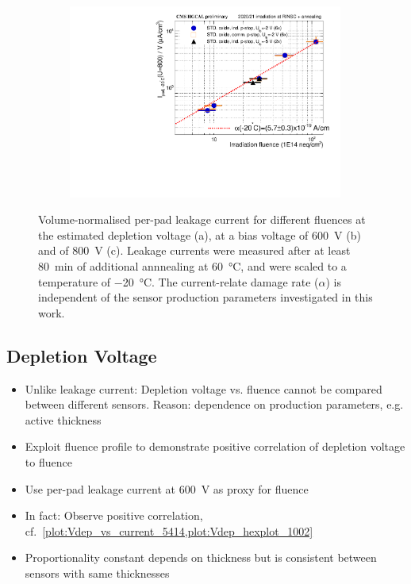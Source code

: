 \begin{figure}
\begin{subfigure}[b]{0.49\textwidth}
		\includegraphics[width=0.99\textwidth]{plots/alpha/alpha_800V.pdf}
		\subcaption{
			}
			\label{plot:alpha_800}
	\end{subfigure}
	\caption{
	    Volume-normalised per-pad leakage current for different fluences at the estimated depletion voltage (a), at a bias voltage of \SI{600}{\volt} (b) and of \SI{800}{\volt} (c).
		Leakage currents were measured after at least \SI{80}{\minute} of additional annnealing at \SI{60}{\celsius}, and were scaled to a temperature of \SI{-20}{\celsius}.
        The current-relate damage rate ($\alpha$) is independent of the sensor production parameters investigated in this work.
	}
\end{figure}

\subsection{Depletion Voltage}
\label{subsec:irradiation_Vdep}

\begin{itemize}
	\item Unlike leakage current: Depletion voltage vs. fluence cannot be compared between different sensors. Reason: dependence on production parameters, e.g. active thickness
	\item Exploit fluence profile to demonstrate positive correlation of depletion voltage to fluence
	\item Use per-pad leakage current at \SI{600}{\volt} as proxy for fluence
	\item In fact: Observe positive correlation, cf.~\ref{plot:Vdep_vs_current_5414,plot:Vdep_hexplot_1002}
	\item Proportionality constant depends on thickness but is consistent between sensors with same thicknesses
\end{itemize}

